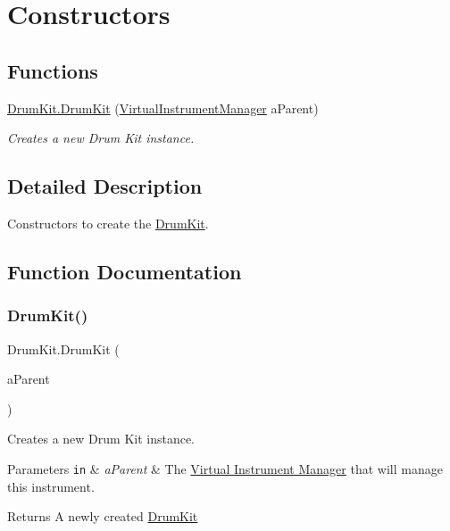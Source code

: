 \hypertarget{group___drum_construct}{}\section{Constructors}
\label{group___drum_construct}
\subsection*{Functions}
\begin{DoxyCompactItemize}
\item 
\hyperlink{group___drum_construct_gabade574e7f9d5684653c0b33524362a7}{Drum\+Kit.\+Drum\+Kit} (\hyperlink{class_virtual_instrument_manager}{Virtual\+Instrument\+Manager} a\+Parent)
\begin{DoxyCompactList}\small\item\em Creates a new Drum Kit instance. \end{DoxyCompactList}\end{DoxyCompactItemize}


\subsection{Detailed Description}
Constructors to create the \hyperlink{class_drum_kit}{Drum\+Kit}. 

\subsection{Function Documentation}
\mbox{\label{group___drum_construct_gabade574e7f9d5684653c0b33524362a7}} 
\subsubsection{\texorpdfstring{Drum\+Kit()}{DrumKit()}}
{\footnotesize\ttfamily Drum\+Kit.\+Drum\+Kit (\begin{DoxyParamCaption}\item[{\hyperlink{class_virtual_instrument_manager}{Virtual\+Instrument\+Manager}}]{a\+Parent }\end{DoxyParamCaption})}



Creates a new Drum Kit instance. 


\begin{DoxyParams}[1]{Parameters}
\mbox{\tt in}  & {\em a\+Parent} & The \hyperlink{group___v_i_m}{Virtual Instrument Manager} that will manage this instrument. \\
\hline
\end{DoxyParams}
\begin{DoxyReturn}{Returns}
A newly created \hyperlink{class_drum_kit}{Drum\+Kit} 
\end{DoxyReturn}


